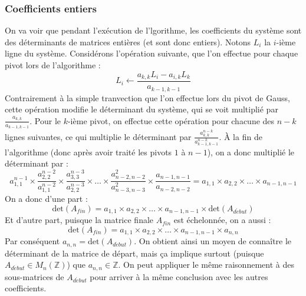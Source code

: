 \documentclass[french]{article}
\begin{document}
\subsubsection{Coefficients entiers}
On va voir que pendant l'exécution de l'lgorithme, les coefficients du système sont des déterminants de matrices entières (et sont donc entiers).
Notons $L_i$ la $i$-ième ligne du système. Considérons l'opération suivante, que l'on effectue pour chaque pivot lors de l'algorithme :
$$L_i \gets \frac{a_{k,k} L_i - a_{i,k} L_k}{a_{k-1,k-1}}$$
Contrairement à la simple tranvection que l'on effectue lors du pivot de Gauss, cette opération modifie le déterminant du système, qui se voit multiplié par $\frac{a_{k,k}}{a_{k-1,k-1}}$.
Pour le $k$-ième pivot, on effectue cette opération pour chacune des $n-k$ lignes suivantes, ce qui multiplie le déterminant par $\frac{a_{k,k}^{n-k}}{a_{k-1,k-1}^{n-k}}$.
À la fin de l'algorithme (donc après avoir traité les pivots $1$ à $n-1$), on a donc multiplié le déterminant par :
$$a_{1,1}^{n-1} \times \frac{a_{2,2}^{n-2}}{a_{1,1}^{n-2}} \times \frac{a_{3,3}^{n-3}}{a_{2,2}^{n-3}} \times \hdots \times \frac{a_{n-2,n-2}^2}{a_{n-3,n-3}^2} \times \frac{a_{n-1,n-1}}{a_{n-2,n-2}} = a_{1,1} \times a_{2,2} \times \hdots \times a_{n-1,n-1}$$
On a donc d'une part :
$$\mbox{det}(A_{fin}) = a_{1,1} \times a_{2,2} \times \hdots \times a_{n-1,n-1} \times \mbox{det}(A_{d\acute{e}but})$$
Et d'autre part, puisque la matrice finale $A_{fin}$ est échelonnée, on a aussi :
$$\mbox{det}(A_{fin}) = a_{1,1} \times a_{2,2} \times \hdots \times a_{n-1,n-1} \times a_{n,n}$$
Par conséquent $a_{n,n} = \mbox{det}(A_{d\acute{e}but})$.
\newline
On obtient ainsi un moyen de connaître le déterminant de la matrice de départ, mais ça implique surtout (puisque $A_{d\acute{e}but} \in M_n(\mathbb{Z})$) que $a_{n,n} \in \mathbb{Z}$. On peut appliquer le même raisonnement à des sous-matrices de $A_{d\acute{e}but}$ pour 	arriver à la même conclusion avec les autres coefficients.  
\newline
\end{document}
